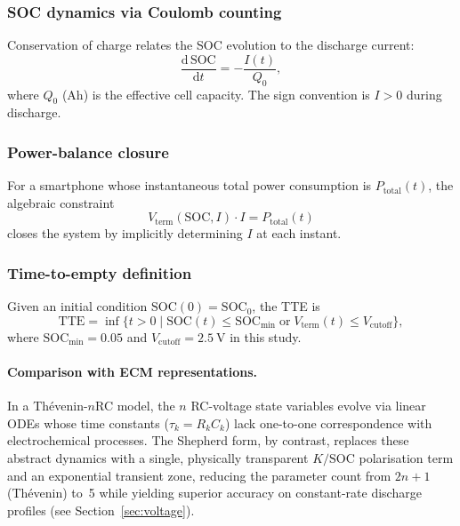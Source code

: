 \documentclass[5p,times,number]{elsarticle}
\newcommand{\secref}[1]{\textcolor{supercolor}{Section~\ref{#1}}}
\begin{document}
\subsubsection{SOC dynamics via Coulomb counting}
Conservation of charge relates the SOC evolution to the discharge current:
\begin{equation}\label{eq:coulomb}
\frac{\mathrm{d}\,\mathrm{SOC}}{\mathrm{d}t} = -\frac{I(t)}{Q_0},
\end{equation}
where $Q_0$ (Ah) is the effective cell capacity.  The sign convention is $I>0$ during discharge.

\subsubsection{Power-balance closure}
For a smartphone whose instantaneous total power consumption is $P_{\mathrm{total}}(t)$, the algebraic constraint
\begin{equation}\label{eq:power}
V_{\mathrm{term}}(\mathrm{SOC}, I) \cdot I = P_{\mathrm{total}}(t)
\end{equation}
closes the system by implicitly determining $I$ at each instant.

\subsubsection{Time-to-empty definition}
Given an initial condition $\mathrm{SOC}(0) = \mathrm{SOC}_0$, the TTE is
\begin{equation}\label{eq:tte}
\mathrm{TTE} = \inf\bigl\{t > 0 \;\big|\; \mathrm{SOC}(t) \le \mathrm{SOC}_{\min} \;\text{or}\; V_{\mathrm{term}}(t) \le V_{\mathrm{cutoff}}\bigr\},
\end{equation}
where $\mathrm{SOC}_{\min} = 0.05$ and $V_{\mathrm{cutoff}} = \SI{2.5}{\volt}$ in this study.

\paragraph{Comparison with ECM representations.}
In a Th\'{e}venin-$n$RC model, the $n$ RC-voltage state variables evolve via linear ODEs whose time constants ($\tau_k = R_k C_k$) lack one-to-one correspondence with electrochemical processes.
The Shepherd form, by contrast, replaces these abstract dynamics with a single, physically transparent $K/\mathrm{SOC}$ polarisation term and an exponential transient zone, reducing the parameter count from $2n+1$ (Th\'{e}venin) to~5 while yielding superior accuracy on constant-rate discharge profiles (see \secref{sec:voltage}).
\end{document}
